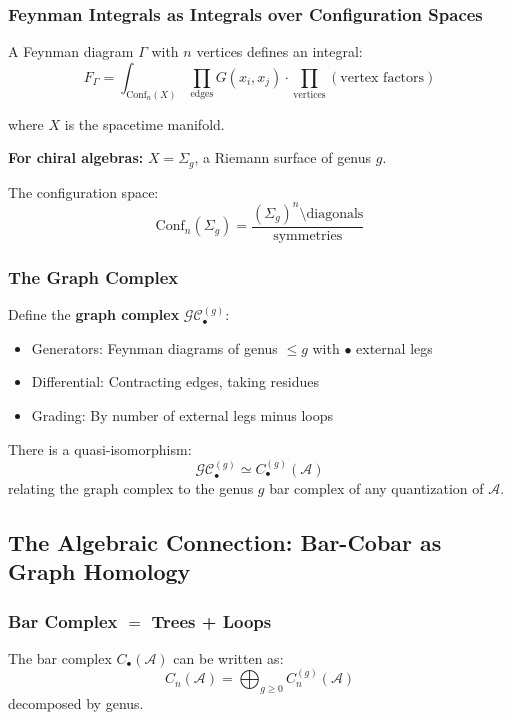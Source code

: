 \subsubsection{Feynman Integrals as Integrals over Configuration Spaces}

A Feynman diagram $\Gamma$ with $n$ vertices defines an integral:
$$F_{\Gamma} = \int_{\mathrm{Conf}_n(X)} \prod_{\text{edges}} G(x_i, x_j) 
\cdot \prod_{\text{vertices}} (\text{vertex factors})$$

where $X$ is the spacetime manifold.

\textbf{For chiral algebras:} $X = \Sigma_g$, a Riemann surface of genus $g$.

The configuration space:
$$\mathrm{Conf}_n(\Sigma_g) = \frac{(\Sigma_g)^n \setminus \text{diagonals}}{\text{symmetries}}$$

\subsubsection{The Graph Complex}

Define the \textbf{graph complex} $\mathcal{GC}_{\bullet}^{(g)}$:
\begin{itemize}
\item Generators: Feynman diagrams of genus $\leq g$ with $\bullet$ external legs
\item Differential: Contracting edges, taking residues
\item Grading: By number of external legs minus loops
\end{itemize}

\begin{theorem}[Kontsevich]
There is a quasi-isomorphism:
$$\mathcal{GC}_{\bullet}^{(g)} \simeq C_{\bullet}^{(g)}(\mathcal{A})$$
relating the graph complex to the genus $g$ bar complex of any quantization of $\mathcal{A}$.
\end{theorem}

\subsection{The Algebraic Connection: Bar-Cobar as Graph Homology}

\subsubsection{Bar Complex $=$ Trees + Loops}

The bar complex $C_{\bullet}(\mathcal{A})$ can be written as:
$$C_n(\mathcal{A}) = \bigoplus_{g \geq 0} C_n^{(g)}(\mathcal{A})$$
decomposed by genus.

